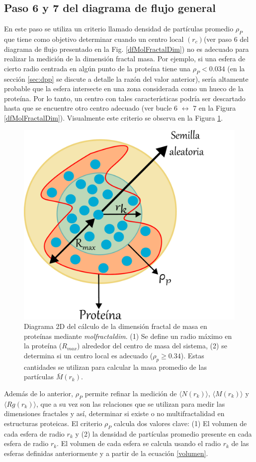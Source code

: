 	 
	 

	 \subsection{Paso 6 y 7 del diagrama de flujo general}
	 \label{sec:paso6}
	 
	 En este paso se utiliza un criterio llamado densidad de part\'{i}culas promedio $\rho_{P}$ que tiene como objetivo determinar cuando un centro local $(r_c)$(ver paso 6 del diagrama de flujo presentado en la Fig. \ref{dfMolFractalDim}) no es adecuado para realizar la medici\'{o}n de la dimensi\'{o}n fractal masa. Por ejemplo, si una esfera de cierto radio centrada en alg\'{u}n punto de la prote\'{i}na tiene una $\rho_{P} < 0.034$ (en la secci\'{o}n \ref*{sec:dpp} se discute a detalle la raz\'{o}n del valor anterior), ser\'{i}a altamente probable que la esfera intersecte en una zona considerada como un hueco de la prote\'{i}na. Por lo tanto, un centro con tales caracter\'{i}sticas podr\'{i}a ser descartado hasta que se encuentre otro centro adecuado (ver bucle 6 $\longleftrightarrow$ 7 en la Figura \ref{dfMolFractalDim}). Visualmente este criterio se observa en la Figura \ref{fig:centrob}. 
	 	 \color{black}
	 
	 	\begin{figure}[H]
	 	\centering
	 	\includegraphics[width=0.5\linewidth]{graphs/centrob4.pdf}
	 	\caption{Diagrama 2D del c\'{a}lculo de la dimensi\'{o}n fractal de masa en prote\'{i}nas mediante \textit{molfractaldim}. (1) Se define un radio m\'{a}ximo en la prote\'{i}na ($R_{max}$) alrededor del centro de masa del sistema, (2) se determina si un centro local es adecuado ($\rho_{p} \geq 0.34$). Estas cantidades se utilizan para calcular la masa promedio de las part\'{i}culas $\bar{M}(r_k)$.}
	 	\label{fig:centrob}
	 \end{figure}
	 
	  Adem\'{a}s de lo anterior, $\rho_{P}$ permite refinar la medici\'{o}n de $\langle N(r_k) \rangle$, $\langle M(r_k) \rangle$ y $\langle Rg(r_k) \rangle$, que a su vez son las relaciones que se utilizan para medir las dimensiones fractales y as\'{i}, determinar si existe o no multifractalidad en estructuras proteicas. El criterio $\rho_{P}$ calcula dos valores clave: (1) El volumen de cada esfera de radio $r_k$ y (2) la densidad de part\'{i}culas promedio presente en cada esfera de radio $r_k$. El volumen de cada esfera se calcula usando el radio $r_k$ de las esferas definidas anteriormente y a partir de la ecuaci\'{o}n \ref{volumen}.\\
	 
